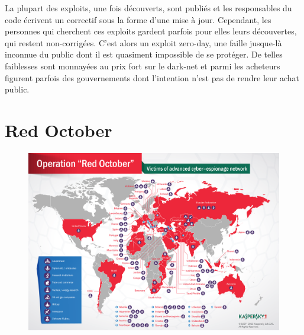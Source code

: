 \documentclass[article, french]{yReport}
\begin{document}
	La plupart des exploits, une fois découverts, sont publiés et les responsables du code écrivent un correctif sous la forme d'une mise à jour.
	Cependant, les personnes qui cherchent ces exploits gardent parfois pour elles leurs découvertes, qui restent non-corrigées.
	C'est alors un exploit zero-day, une faille jusque-là inconnue du public dont il est quasiment impossible de se protéger.
	De telles faiblesses sont monnayées au prix fort sur le dark-net et parmi les acheteurs figurent parfois des gouvernements dont l'intention n'est pas de rendre leur achat public.
	
	\newpage
	\section{Red October}
	\begin{figure}[ht!]
		\vspace*{3mm}
		\begin{centered}
			\includegraphics[width=\linewidth]{images/redOctober.png}
		\end{centered}
		\vspace*{5mm}
	\end{figure}
	
\end{document}
